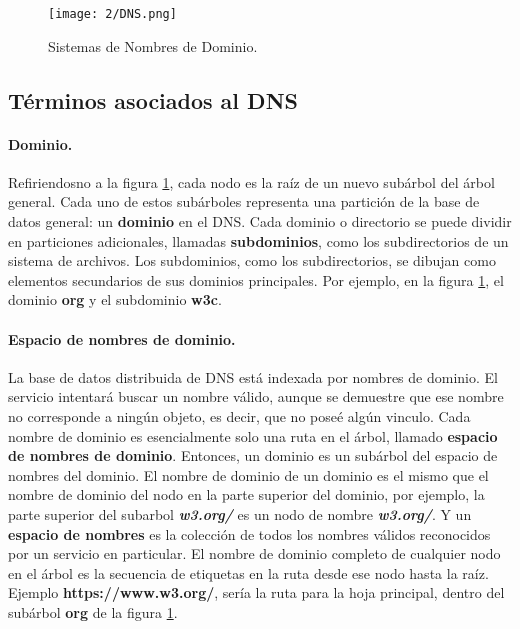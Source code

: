 			
		\begin{figure}									
			\texttt{[image: 2/DNS.png]}		
			\caption{Sistemas de Nombres de Dominio. }
			\label{fig:DNS} 		
		\end{figure}

\subsection{Términos asociados al DNS}

\paragraph{Dominio.}  Refiriendosno a la  figura \ref{fig:DNS}, cada nodo es  la raíz de un nuevo subárbol del árbol general. Cada uno de estos subárboles representa una partición de la base de datos general: un \textbf{dominio} en el DNS. Cada dominio o directorio se puede dividir en particiones adicionales, llamadas \textbf{subdominios}, como los subdirectorios de un sistema de archivos. Los subdominios, como los subdirectorios, se dibujan como elementos secundarios de sus dominios principales. Por ejemplo, en la figura \ref{fig:DNS}, el dominio \textbf{org} y el subdominio \textbf{w3c}.


\paragraph{Espacio de nombres de dominio.}  La base de datos distribuida de DNS está indexada por nombres de dominio. El servicio intentará buscar un nombre válido, aunque se demuestre que ese nombre no corresponde a ningún objeto, es decir, que no poseé algún vinculo.  Cada nombre de dominio es esencialmente solo una ruta en el árbol, llamado \textbf{espacio de nombres de dominio}. 
Entonces, un dominio es  un subárbol del espacio de nombres del dominio. El nombre de dominio de un dominio es el mismo que el nombre de dominio del nodo en la parte superior del dominio, por ejemplo, la parte superior del subarbol \textit{\textbf{w3.org/}} es un nodo de nombre \textit{\textbf{w3.org/}}. Y un \textbf{espacio de nombres} es la colección de todos los nombres válidos reconocidos por un servicio en particular. El nombre de dominio completo de cualquier nodo en el árbol es la secuencia de etiquetas en la ruta desde ese nodo hasta la raíz. Ejemplo {\textbf{https://www.w3.org/}}, sería la ruta para la hoja principal, dentro del subárbol \textbf{org} de la figura \ref{fig:DNS}.

